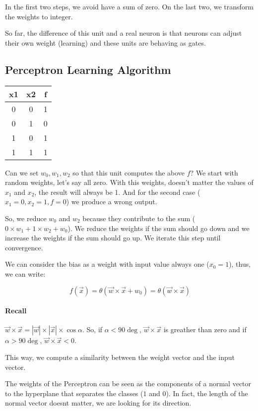 \documentclass[main]{subfiles}
\begin{document}
In the first two steps, we avoid have a sum of zero. On the last two, we transform the weights to integer.

So far, the difference of this unit and a real neuron is that neurons can adjust their own weight (learning) and these units are behaving as gates.

\subsection{Perceptron Learning Algorithm}

\begin{table}[H]
\begin{tabular}{cc|c}
x1 & x2 & f \\ 
\hline
0  & 0  & 1 \\
0  & 1  & 0 \\
1  & 0  & 1 \\
1  & 1  & 1 \\ 
\end{tabular}
\end{table}

Can we set $w_0, w_1, w_2$ so that this unit computes the above $f$?
We start with random weights, let's say all zero. With this weights, doesn't matter the values of $x_1$ and $x_2$, the result will always be 1. And for the second case ($x_1 = 0, x_2 = 1, f = 0$) we produce a wrong output.

So, we reduce $w_0$ and $w_2$ because they contribute to the sum ($0 \times w_1 + 1 \times w_2 + w_0$). We reduce the weights if the sum should go down and we increase the weights if the sum should go up. We iterate this step until convergence.

We can consider the bias as a weight with input value always one ($x_0 = 1$), thus, we can write:

\[ f(\vec{x}) = \theta(\vec{w} \times \vec{x} + w_0) = \theta(\vec{w} \times \vec{x}) \]

\paragraph{Recall} $\vec{w} \times \vec{x} = |\vec{w}| \times |\vec{x}| \times \cos \alpha$.  So, if $\alpha < 90\deg$, $\vec{w} \times \vec{x}$ is greather than zero and if $\alpha > 90\deg$, $\vec{w} \times \vec{x} < 0$.

This way, we compute a similarity between the weight vector and the input vector.

The weights of the Perceptron can be seen as the components of a normal vector to the hyperplane that separates the classes ($1$ and $0$). In  fact, the  length of the normal vector doesnt matter, we are looking for its direction.
\end{document}
